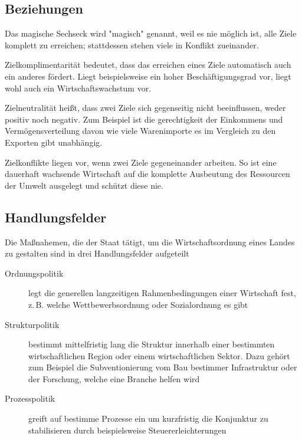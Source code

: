 \documentclass{article}
\begin{document}
\subsection{Beziehungen} 
\begin{multicols}{1} 
\noindent Das magische Sechseck wird "magisch" genannt, weil es nie möglich ist, alle Ziele komplett zu erreichen; stattdessen stehen viele in Konflikt zueinander.
\begin{description*}
 \item[Zielkomplimentarität] bedeutet, dass das erreichen eines Ziele automatisch auch ein anderes fördert. Liegt beispielsweise ein hoher Beschäftigungsgrad vor, liegt wohl auch ein Wirtschaftswachstum vor.
 \item[Zielneutralität] heißt, dass zwei Ziele sich gegenseitig nicht beeinflussen, weder positiv noch negativ. Zum Beispiel ist die gerechtigkeit der Einkommens und Vermögensverteilung davon wie viele Warenimporte es im Vergleich zu den Exporten gibt unabhängig.
 \item[Zielkonflikte] liegen vor, wenn zwei Ziele gegeneinander arbeiten. So ist eine dauerhaft wachsende Wirtschaft auf die komplette Ausbeutung des Ressourcen der Umwelt ausgelegt und schützt diese nie.
\end{description*} 
\end{multicols} 
 
\subsection{Handlungsfelder}
Die Maßnahemen, die der Staat tätigt, um die Wirtschaftsordnung eines Landes zu gestalten sind in drei Handlungsfelder aufgeteilt 
\begin{description}
 \item[Ordnungspolitik] legt die generellen langzeitigen Rahmenbedingungen einer Wirtschaft fest, z.\,B. welche Wettbewerbsordnung oder Sozialordnung es gibt
 \item[Strukturpolitik] bestimmt mittelfristig lang die Struktur innerhalb einer bestimmten wirtschaftlichen Region oder einem wirtschaftlichen Sektor. Dazu gehört zum Beispiel die Subventionierung vom Bau bestimmer Infrastruktur oder der Forschung, welche eine Branche helfen wird 
 \item[Prozesspolitik] greift auf bestimme Prozesse ein um kurzfristig die Konjunktur zu stabilisieren durch beispielsweise Steuererleichterungen
\end{description} 
\end{document}
